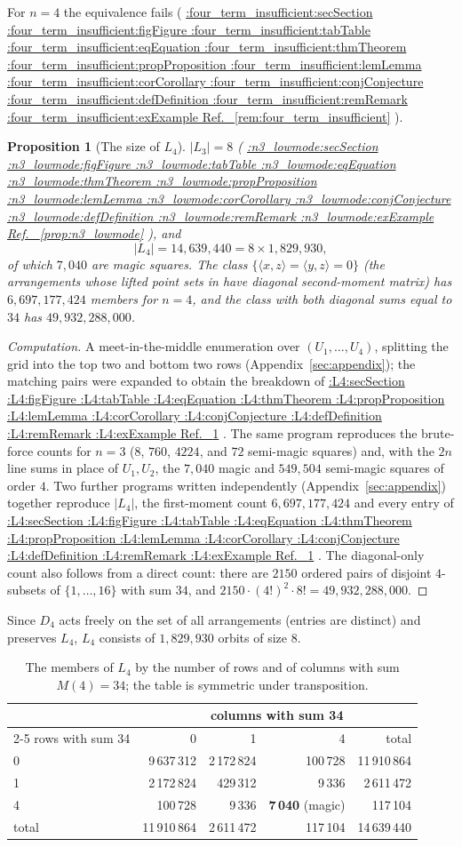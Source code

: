 \documentclass[11pt,a4paper]{article}
\makeatletter
\def\Cref@getprefix#1:#2\relax{#1}
\def\Cref@prefix@sec{sec}
\def\Cref@prefix@fig{fig}
\def\Cref@prefix@tab{tab}
\def\Cref@prefix@eq{eq}
\def\Cref@prefix@thm{thm}
\def\Cref@prefix@prop{prop}
\def\Cref@prefix@lem{lem}
\def\Cref@prefix@cor{cor}
\def\Cref@prefix@conj{conj}
\def\Cref@prefix@def{def}
\def\Cref@prefix@rem{rem}
\def\Cref@prefix@ex{ex}
\def\Cref@type@cap#1{%
  \edef\Cref@tmp{#1}%
  \ifx\Cref@tmp\Cref@prefix@sec Section%
  \else\ifx\Cref@tmp\Cref@prefix@fig Figure%
  \else\ifx\Cref@tmp\Cref@prefix@tab Table%
  \else\ifx\Cref@tmp\Cref@prefix@eq Equation%
  \else\ifx\Cref@tmp\Cref@prefix@thm Theorem%
  \else\ifx\Cref@tmp\Cref@prefix@prop Proposition%
  \else\ifx\Cref@tmp\Cref@prefix@lem Lemma%
  \else\ifx\Cref@tmp\Cref@prefix@cor Corollary%
  \else\ifx\Cref@tmp\Cref@prefix@conj Conjecture%
  \else\ifx\Cref@tmp\Cref@prefix@def Definition%
  \else\ifx\Cref@tmp\Cref@prefix@rem Remark%
  \else\ifx\Cref@tmp\Cref@prefix@ex Example%
  \else Ref.%
  \fi\fi\fi\fi\fi\fi\fi\fi\fi\fi\fi\fi
}
\DeclareRobustCommand{\Cref}[1]{%
  \begingroup
  \edef\Cref@label{#1}%
  \edef\Cref@prefix{\expandafter\Cref@getprefix\Cref@label:\relax}%
  \hyperref[#1]{\Cref@type@cap{\Cref@prefix}~\ref*{#1}}%
  \endgroup
}
\theoremstyle{plain}
\newtheorem{proposition}[theorem]{Proposition}
\theoremstyle{definition}
\theoremstyle{remark}
\makeatother
\begin{document}
For $n=4$ the equivalence fails (\Cref{rem:four_term_insufficient}).

\begin{proposition}[The size of $L_4$]
\label{prop:L4}
$|L_3|=8$ (\Cref{prop:n3_lowmode}), and
\[
|L_4|=14{,}639{,}440=8\times1{,}829{,}930,
\]
of which $7{,}040$ are magic squares.
The class $\{\langle x,z\rangle=\langle y,z\rangle=0\}$ (the arrangements whose lifted point sets in \cite{mathewson_gems} have diagonal second-moment matrix) has $6{,}697{,}177{,}424$ members for $n=4$, and the class with both diagonal sums equal to $34$ has $49{,}932{,}288{,}000$.
\end{proposition}

\begin{proof}[Computation]
A meet-in-the-middle enumeration over $(U_1,\dots,U_4)$, splitting the grid into the top two and bottom two rows (Appendix~\ref{sec:appendix}); the matching pairs were expanded to obtain the breakdown of \Cref{tab:L4}.
The same program reproduces the brute-force counts for $n=3$ ($8$, $760$, $4224$, and $72$ semi-magic squares) and, with the $2n$ line sums in place of $U_1,U_2$, the $7{,}040$ magic and $549{,}504$ semi-magic squares of order $4$.
Two further programs written independently (Appendix~\ref{sec:appendix}) together reproduce $|L_4|$, the first-moment count $6{,}697{,}177{,}424$ and every entry of \Cref{tab:L4}.
The diagonal-only count also follows from a direct count: there are $2150$ ordered pairs of disjoint $4$-subsets of $\{1,\dots,16\}$ with sum $34$, and $2150\cdot(4!)^2\cdot8!=49{,}932{,}288{,}000$.
\end{proof}

Since $D_4$ acts freely on the set of all arrangements (entries are distinct) and preserves $L_4$, $L_4$ consists of $1{,}829{,}930$ orbits of size $8$.

\begin{table}[htbp]
\centering
\small
\begin{tabular}{lrrrr}
\toprule
 & \multicolumn{4}{c}{columns with sum 34} \\
\cmidrule(lr){2-5}
rows with sum 34 & 0 & 1 & 4 & total \\
\midrule
0 & 9\,637\,312 & 2\,172\,824 & 100\,728 & 11\,910\,864 \\
1 & 2\,172\,824 & 429\,312 & 9\,336 & 2\,611\,472 \\
4 & 100\,728 & 9\,336 & \textbf{7\,040} (magic) & 117\,104 \\
\midrule
total & 11\,910\,864 & 2\,611\,472 & 117\,104 & 14\,639\,440 \\
\bottomrule
\end{tabular}
\caption{The members of $L_4$ by the number of rows and of columns with sum $M(4)=34$; the table is symmetric under transposition.}
\label{tab:L4}
\end{table}
\end{document}
